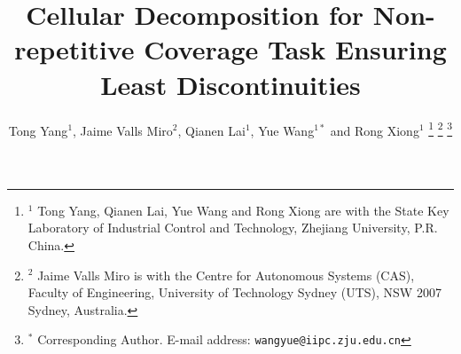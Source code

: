 \documentclass[journal]{IEEEtran}
\begin{document}
%
\title{Cellular Decomposition for Non-repetitive Coverage Task Ensuring Least Discontinuities}
%
%
%


\author{Tong Yang$^1$, Jaime Valls Miro$^2$, Qianen Lai$^1$, Yue Wang$^{1*}$ and Rong Xiong$^1$
\thanks{$^1$ Tong Yang, Qianen Lai, Yue Wang and Rong Xiong are with the State Key Laboratory of Industrial Control and Technology, Zhejiang University, P.R. China. 
}
\thanks{$^2$ Jaime Valls Miro is with the Centre for Autonomous Systems (CAS), Faculty of Engineering, University of Technology Sydney (UTS), NSW 2007 Sydney, Australia.}
\thanks{$^*$ Corresponding Author. \newline \indent
E-mail address: {\tt\small wangyue@iipc.zju.edu.cn}}
}
\end{document}
